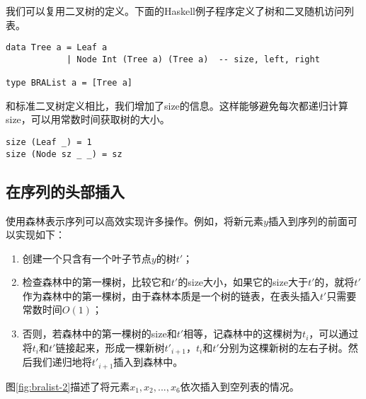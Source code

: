 \documentclass[UTF8]{article}
\begin{document}
我们可以复用二叉树的定义。下面的Haskell例子程序定义了树和二叉随机访问列表。

\lstset{language=Haskell}
\begin{lstlisting}[style=Haskell]
data Tree a = Leaf a
            | Node Int (Tree a) (Tree a)  -- size, left, right

type BRAList a = [Tree a]
\end{lstlisting}

和标准二叉树定义相比，我们增加了size的信息。这样能够避免每次都递归计算size，可以用常数时间获取树的大小。

\begin{lstlisting}[style=Haskell]
size (Leaf _) = 1
size (Node sz _ _) = sz
\end{lstlisting}

\subsection{在序列的头部插入}
使用森林表示序列可以高效实现许多操作。例如，将新元素$y$插入到序列的前面可以实现如下：

\begin{enumerate}
\item 创建一个只含有一个叶子节点$y$的树$t'$；
\item 检查森林中的第一棵树，比较它和$t'$的size大小，如果它的size大于$t'$的，就将$t'$作为森林中的第一棵树，由于森林本质是一个树的链表，在表头插入$t'$只需要常数时间$O(1)$；
\item 否则，若森林中的第一棵树的size和$t'$相等，记森林中的这棵树为$t_i$，可以通过将$t_i$和$t'$链接起来，形成一棵新树$t'_{i+1}$，$t_i$和$t'$分别为这棵新树的左右子树。然后我们递归地将$t'_{i+1}$插入到森林中。
\end{enumerate}

图\ref{fig:bralist-2}描述了将元素$x_1, x_2, ..., x_6$依次插入到空列表的情况。
\end{document}
